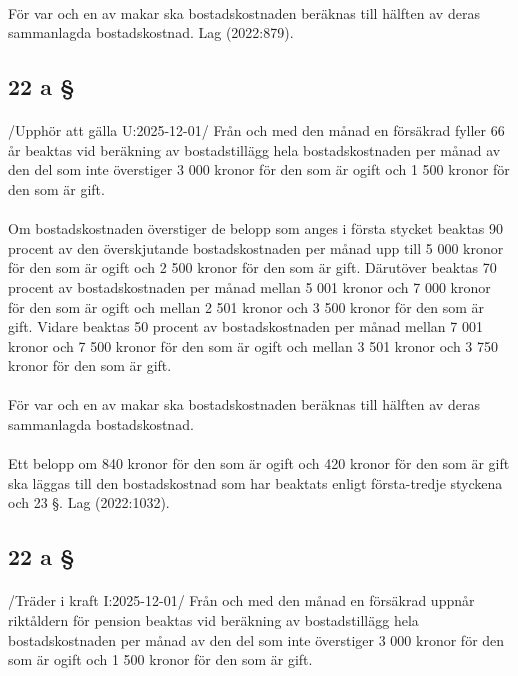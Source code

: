 \documentclass[a4paper,notitlepage,openany,10pt]{book}
\begin{document}
\paragraph*{}
För var och en av makar ska bostadskostnaden beräknas till hälften av deras sammanlagda bostadskostnad.
Lag (2022:879).
\subsection*{22 a §}
\paragraph*{}
/Upphör att gälla U:2025-12-01/
Från och med den månad en försäkrad fyller 66 år beaktas vid beräkning av bostadstillägg hela bostadskostnaden per månad av den del som inte överstiger 3 000 kronor för den som är ogift och 1 500 kronor för den som är gift.
\paragraph*{}
Om bostadskostnaden överstiger de belopp som anges i första stycket beaktas 90 procent av den överskjutande bostadskostnaden per månad upp till 5 000 kronor för den som är ogift och 2 500 kronor för den som är gift. Därutöver beaktas 70 procent av bostadskostnaden per månad mellan 5 001 kronor och 7 000 kronor för den som är ogift och mellan 2 501 kronor och 3 500 kronor för den som är gift. Vidare beaktas 50 procent av bostadskostnaden per månad mellan 7 001 kronor och 7 500 kronor för den som är ogift och mellan 3 501 kronor och 3 750 kronor för den som är gift.
\paragraph*{}
För var och en av makar ska bostadskostnaden beräknas till hälften av deras sammanlagda bostadskostnad.
\paragraph*{}
Ett belopp om 840 kronor för den som är ogift och 420 kronor för den som är gift ska läggas till den bostadskostnad som har beaktats enligt första-tredje styckena och 23 §.
Lag (2022:1032).
\subsection*{22 a §}
\paragraph*{}
/Träder i kraft I:2025-12-01/
Från och med den månad en försäkrad uppnår riktåldern för pension beaktas vid beräkning av bostadstillägg hela bostadskostnaden per månad av den del som inte överstiger 3 000 kronor för den som är ogift och 1 500 kronor för den som är gift.
\end{document}
